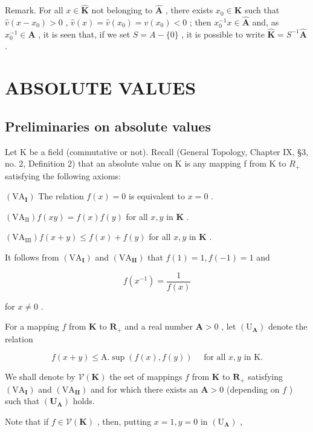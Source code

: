 Remark. For all \(x \in \hat{\mathbf{K}}\) not belonging to \(\hat{\mathbf{A}}\) , there exists \(x_0 \in \mathbf{K}\) such that \(\hat{v}(x - x_0) > 0\) , \(\hat{v}(x) = \hat{v}(x_0) = v(x_0) < 0\) ; then \(x_0^{-1}x \in \hat{\mathbf{A}}\) and, as \(x_0^{-1} \in \mathbf{A}\) , it is seen that, if we set \(S = A - \{0\}\) , it is possible to write \(\hat{\mathbf{K}} = S^{-1}\hat{\mathbf{A}}\) .

\section{ABSOLUTE VALUES}

\subsection{Preliminaries on absolute values}

Let K be a field (commutative or not). Recall (General Topology, Chapter IX, §3, no. 2, Definition 2) that an absolute value on K is any mapping f from K to \(R_{+}\) satisfying the following axioms:

\((\mathrm{VA}_{\mathbf{I}})\) The relation \(f(x) = 0\) is equivalent to \(x = 0\) .

\((\mathrm{VA}_{\mathrm{II}}) f(xy) = f(x)f(y)\) for all \(x, y\) in \(\mathbf{K}\) .

\((\mathrm{VA}_{\mathrm{III}}) f(x + y) \leqslant f(x) + f(y)\) for all \(x, y\) in \(\mathbf{K}\) .

It follows from \((\mathrm{VA}_{\mathbf{I}})\) and \((\mathrm{VA}_{\mathbf{II}})\) that \(f(1) = 1, f(-1) = 1\) and

\[
f (x ^ {- 1}) = \frac {1}{f (x)}
\]

for \(x \neq 0\) .

For a mapping \(f\) from \(\mathbf{K}\) to \(\mathbf{R}_{+}\) and a real number \(\mathbf{A} > 0\) , let \((\mathrm{U}_{\mathbf{A}})\) denote the relation

\[
f (x + y) \leqslant \mathrm{A}. \sup (f (x), f (y)) \quad \text {   for   all   } x, y \text {   in   } \mathrm{K}.
\]

We shall denote by \(\mathcal{V}(\mathbf{K})\) the set of mappings \(f\) from \(\mathbf{K}\) to \(\mathbf{R}_{+}\) satisfying \((\mathrm{VA}_{\mathbf{I}})\) and \((\mathrm{VA}_{\mathbf{II}})\) and for which there exists an \(\mathbf{A} > 0\) (depending on \(f\) ) such that \((\mathbf{U}_{\mathbf{A}})\) holds.

Note that if \(f \in \mathcal{V}(\mathbf{K})\) , then, putting \(x = 1, y = 0\) in \((\mathrm{U}_{\mathbf{A}})\) ,

